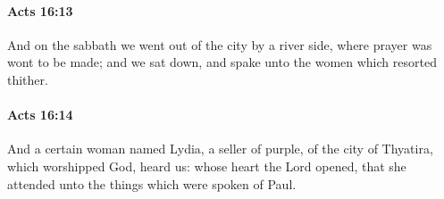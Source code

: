 		\paragraph{Acts 16:13} %
			\label{ACTS-16-13}

			And on the sabbath we went out of the city by a river side, where prayer was wont to be made; and we sat down, and spake unto the women which resorted thither.

			\begin{framed}
			\scriptsize
				\begin{compactdesc}
					\item[SBLG] 
				\end{compactdesc}
			\end{framed}

		\paragraph{Acts 16:14} %
			\label{ACTS-16-14}

			And a certain woman named Lydia, a seller of purple, of the city of Thyatira, which worshipped God, heard us: whose heart the Lord opened, that she attended unto the things which were spoken of Paul.


